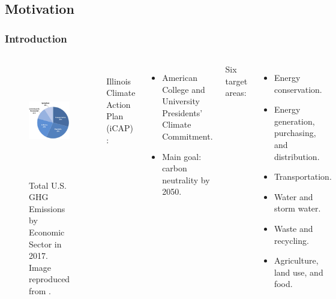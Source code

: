 \subsection{Motivation}
\begin{frame}
\frametitle{Introduction}
\begin{columns}
    \column[t]{5cm}
	\begin{figure}[htbp!]
		\begin{center}
			\includegraphics[height=5.0cm]{images/total-ghg-2017.png}
		\end{center}
		\caption{Total U.S. GHG Emissions by Economic Sector in 2017. Image reproduced from \cite{us_epa_sources_2020}.}
	\end{figure}

	\column[t]{5cm}
	\\
	Illinois Climate Action Plan (iCAP) \cite{isee_illinois_2015}:
	\begin{itemize}
		\item American College and University Presidents’ Climate Commitment.
		\item Main goal: carbon neutrality by 2050.
	\end{itemize}
	\vspace{0.75cm}
	Six target areas:
	\begin{itemize}
		\item Energy conservation.
		\item Energy generation, purchasing, and distribution.
		\item Transportation.
		\item Water and storm water.
		\item Waste and recycling.
		\item Agriculture, land use, and food.
	\end{itemize}
\end{columns}
\end{frame}


